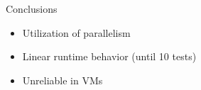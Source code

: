 \begin{frame}{Conclusions}
    \begin{itemize}
        \item Utilization of parallelism
        \item Linear runtime behavior (until 10 tests)
        \item Unreliable in VMs
    \end{itemize}
\end{frame}

